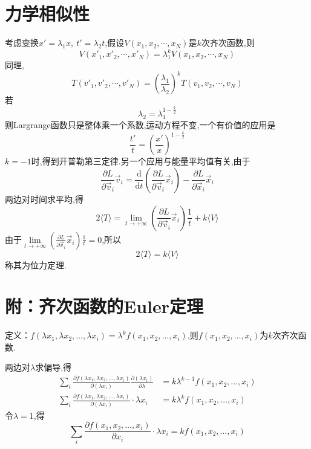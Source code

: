 \section{力学相似性}
考虑变换$x'=\lambda_1 x,\ t'=\lambda_2 t$,假设$V(x_1,x_2,\cdots,x_N)$是$k$次齐次函数,则
\begin{equation}
V(x'_1,x'_2,\cdots,x'_N) = \lambda_1^k V(x_1,x_2,\cdots,x_N)
\end{equation}
同理,
\begin{equation}
T(v'_1,v'_2,\cdots,v'_N) = \left(\frac{\lambda_1}{\lambda_2}\right)^k %
T(v_1,v_2,\cdots,v_N)
\end{equation}
若
\begin{equation}
\lambda_2 = \lambda_1^{1-\frac{k}{2}}
\end{equation}
则Largrange函数只是整体乘一个系数,运动方程不变,一个有价值的应用是
\begin{equation}
\frac{t'}{t} = \left(\frac{x'}{x}\right)^{1-\frac{k}{2}}
\end{equation}
$k=-1$时,得到开普勒第三定律.另一个应用与能量平均值有关,由于 %
\begin{equation}
\frac{\partial L}{\partial \vec{v}_i}\vec{v}_i = \frac{\mathrm{d}}{\mathrm{d}t}
\left(
\frac{\partial L}{\partial \vec{v}_i}\vec{x}_i
\right)
- \frac{\partial L}{\partial \vec{x}_i}\vec{x}_i
\end{equation}
两边对时间求平均,得
\begin{equation}
2\langle T \rangle = \lim_{t \rightarrow +\infty} \left(\frac{\partial L}{\partial \vec{v}_i}\vec{x}_i\right)\frac{1}{t} + k\langle V \rangle
\end{equation}
由于$\lim\limits_{t \rightarrow +\infty} \left(\frac{\partial L}{\partial \vec{v}_i}\vec{x}_i\right)\frac{1}{t} = 0$,所以
\begin{equation}
2\langle T \rangle = k\langle V \rangle
\end{equation}
称其为位力定理.

\section*{附：齐次函数的Euler定理}

定义：$f(\lambda x_1,\lambda x_2,\dots,\lambda x_i) = \lambda^k f(x_1,x_2,\dots,x_i)$,则$f(x_1,x_2,\dots,x_i)$为$k$次齐次函数.

两边对$\lambda$求偏导,得
\begin{align}
\sum\limits_{i}\frac{\partial f(\lambda x_1,\lambda x_2,\dots,\lambda x_i)}{\partial(\lambda x_i)}
\frac{\partial(\lambda x_i)}{\partial \lambda} & = k\lambda^{k-1}f(x_1,x_2,\dots,x_i)\\
\sum_{i}\frac{\partial f(\lambda x_1,\lambda x_2,\dots,\lambda x_i)}{\partial(\lambda x_i)}\cdot
\lambda x_i & = k\lambda^{k}f(x_1,x_2,\dots,x_i)
\end{align}
令$\lambda = 1$,得
\begin{equation}
\sum\limits_{i}\frac{\partial f(x_1, x_2,\dots,x_i)}{\partial x_i}\cdot
\lambda x_i = kf(x_1,x_2,\dots,x_i)
\end{equation}